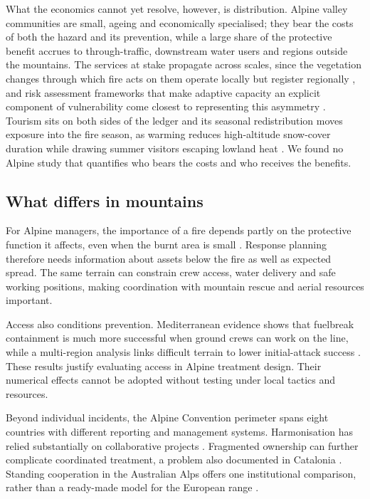 \documentclass[11pt,a4paper]{article}
\begin{document}
What the economics cannot yet resolve, however, is distribution. Alpine valley communities are small, ageing and economically specialised; they bear the costs of both the hazard and its prevention, while a large share of the protective benefit accrues to through-traffic, downstream water users and regions outside the mountains. The services at stake propagate across scales, since the vegetation changes through which fire acts on them operate locally but register regionally \citep{vukomanovic_systematic_2019}, and risk assessment frameworks that make adaptive capacity an explicit component of vulnerability come closest to representing this asymmetry \citep{riviere_mapping_2023, lecinadiaz_assessing_2021}. Tourism sits on both sides of the ledger and its seasonal redistribution moves exposure into the fire season, as warming reduces high-altitude snow-cover duration while drawing summer visitors escaping lowland heat \citep{pede_mountain_2022, abrham_wildfires_2024}. We found no Alpine study that quantifies who bears the costs and who receives the benefits.

\subsection{What differs in mountains}

For Alpine managers, the importance of a fire depends partly on the protective function it affects, even when the burnt area is small \citep{muller_forest_2020}. Response planning therefore needs information about assets below the fire as well as expected spread. The same terrain can constrain crew access, water delivery and safe working positions, making coordination with mountain rescue and aerial resources important.

Access also conditions prevention. Mediterranean evidence shows that fuelbreak containment is much more successful when ground crews can work on the line, while a multi-region analysis links difficult terrain to lower initial-attack success \citep{ortega_modeling_2024, cardil_assessing_2025}. These results justify evaluating access in Alpine treatment design. Their numerical effects cannot be adopted without testing under local tactics and resources.

Beyond individual incidents, the Alpine Convention perimeter spans eight countries with different reporting and management systems. Harmonisation has relied substantially on collaborative projects \citep{valese_wildfires_2011}. Fragmented ownership can further complicate coordinated treatment, a problem also documented in Catalonia \citep{gorrizmifsud_current_2026}. Standing cooperation in the Australian Alps offers one institutional comparison, rather than a ready-made model for the European range \citep{lockwood_biodiversity_2014}.
\end{document}
